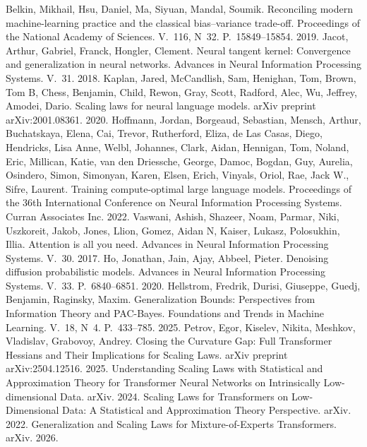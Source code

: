  Belkin, Mikhail, Hsu, Daniel, Ma, Siyuan, Mandal, Soumik. Reconciling modern machine-learning practice and the classical bias--variance trade-off. Proceedings of the National Academy of Sciences. V.~116, N~32. P.~15849--15854. 2019.
 Jacot, Arthur, Gabriel, Franck, Hongler, Clement. Neural tangent kernel: Convergence and generalization in neural networks. Advances in Neural Information Processing Systems. V.~31. 2018.
 Kaplan, Jared, McCandlish, Sam, Henighan, Tom, Brown, Tom B, Chess, Benjamin, Child, Rewon, Gray, Scott, Radford, Alec, Wu, Jeffrey, Amodei, Dario. Scaling laws for neural language models. arXiv preprint arXiv:2001.08361. 2020.
 Hoffmann, Jordan, Borgeaud, Sebastian, Mensch, Arthur, Buchatskaya, Elena, Cai, Trevor, Rutherford, Eliza, de Las Casas, Diego, Hendricks, Lisa Anne, Welbl, Johannes, Clark, Aidan, Hennigan, Tom, Noland, Eric, Millican, Katie, van den Driessche, George, Damoc, Bogdan, Guy, Aurelia, Osindero, Simon, Simonyan, Karen, Elsen, Erich, Vinyals, Oriol, Rae, Jack W., Sifre, Laurent. Training compute-optimal large language models. Proceedings of the 36th International Conference on Neural Information Processing Systems. Curran Associates Inc. 2022.
 Vaswani, Ashish, Shazeer, Noam, Parmar, Niki, Uszkoreit, Jakob, Jones, Llion, Gomez, Aidan N, Kaiser, Lukasz, Polosukhin, Illia. Attention is all you need. Advances in Neural Information Processing Systems. V.~30. 2017.
 Ho, Jonathan, Jain, Ajay, Abbeel, Pieter. Denoising diffusion probabilistic models. Advances in Neural Information Processing Systems. V.~33. P.~6840--6851. 2020.
 Hellstrom, Fredrik, Durisi, Giuseppe, Guedj, Benjamin, Raginsky, Maxim. Generalization Bounds: Perspectives from Information Theory and PAC-Bayes. Foundations and Trends in Machine Learning. V.~18, N~4. P.~433--785. 2025.
 Petrov, Egor, Kiselev, Nikita, Meshkov, Vladislav, Grabovoy, Andrey. Closing the Curvature Gap: Full Transformer Hessians and Their Implications for Scaling Laws. arXiv preprint arXiv:2504.12516. 2025.
 Understanding Scaling Laws with Statistical and Approximation Theory for Transformer Neural Networks on Intrinsically Low-dimensional Data. arXiv. 2024.
 Scaling Laws for Transformers on Low-Dimensional Data: A Statistical and Approximation Theory Perspective. arXiv. 2022.
 Generalization and Scaling Laws for Mixture-of-Experts Transformers. arXiv. 2026.

